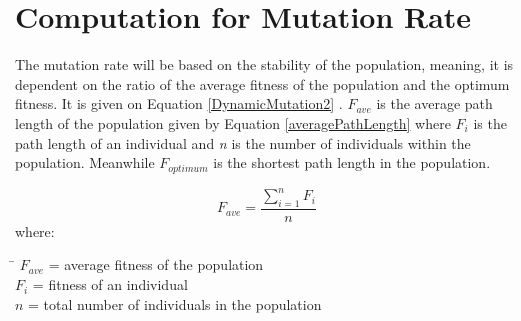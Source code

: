 \section{Computation for Mutation Rate} \label{compMutation}
\indent \indent The mutation rate will be based on the stability of the population, meaning, it is dependent on the ratio of the average fitness of the population and the optimum fitness. It is given on Equation \ref{DynamicMutation2} \cite{xu2018application}. $F_{ave}$ is the average path length of the population given by Equation \ref{averagePathLength} where $F_i$ is the path length of an individual and \emph{n} is the number of individuals within the population. Meanwhile $F_{optimum}$ is the shortest path length in the population.\par

\begin{equation} \label{averagePathLength}
	F_{ave} = \frac{\sum_{i=1}^{n} F_{i}}{n}
\end{equation}
where:
\begin{tabbing}
	\= \kill
	$F_{ave}$\> = average fitness of the population\\
	$F_{i}$\> = fitness of an individual\\
	$n$\> = total number of individuals in the population\\
\end{tabbing}

